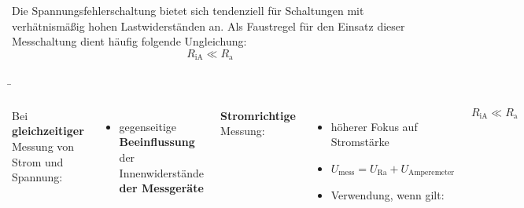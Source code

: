 \begin{frame}
{	Die Spannungsfehlerschaltung bietet sich tendenziell für Schaltungen mit verhätnismäßig hohen Lastwiderständen an.
	Als Faustregel für den Einsatz dieser Messchaltung dient häufig folgende Ungleichung:
	\begin{equation*}
		R_{\mathrm{iA}} \ll R_{\mathrm{a}}
	\end{equation*}

	}

	\b{

		\begin{columns}
		 Bei \textbf{gleichzeitiger} Messung von Strom und Spannung:
		 \begin{itemize}
			\item gegenseitige \textbf{Beeinflussung} der Innenwiderstände \textbf{der Messgeräte}
		 \end{itemize}


		 \vspace{5pt}

		 \textbf{Stromrichtige} Messung:

		 \begin{itemize}
			\item höherer Fokus auf Stromstärke
			\item $U_\mathrm{mess} = U_\mathrm{Ra} + U_\mathrm{Amperemeter}$
			\item Verwendung, wenn gilt:
		\end{itemize}

		\begin{equation*}
			R_{\mathrm{iA}} \ll R_{\mathrm{a}}
		\end{equation*}








\end{columns}}
\end{frame}
